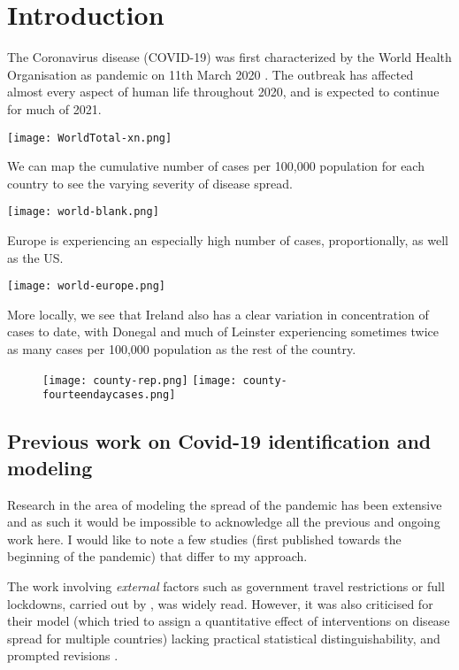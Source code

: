 \section{Introduction}
\label{ch:intro}

The Coronavirus disease (COVID-19) was first characterized by the World Health Organisation as pandemic on 11th March 2020 \cite{whodeclare20}. The outbreak has affected almost every aspect of human life throughout 2020, and is expected to continue for much of 2021. 

\texttt{[image: WorldTotal-xn.png]}

We can map the cumulative number of cases per 100,000 population for each country to see the varying severity of disease spread. 

\texttt{[image: world-blank.png]}

Europe is experiencing an especially high number of cases, proportionally, as well as the US.

\texttt{[image: world-europe.png]}

More locally, we see that Ireland also has a clear variation in concentration of cases to date, with Donegal and much of Leinster experiencing sometimes twice as many cases per 100,000 population as the rest of the country.

\begin{figure}[H]
\texttt{[image: county-rep.png]}
\endminipage\hfill
{}
\texttt{[image: county-fourteendaycases.png]}
\endminipage
\end{figure}

\subsection{Previous work on Covid-19 identification and modeling}
Research in the area of modeling the spread of the pandemic has been extensive and as such it would be impossible to acknowledge all the previous and ongoing work here. I would like to note a few studies (first published towards the beginning of the pandemic) that differ to my approach.

The work involving \textit{external} factors such as government travel restrictions or full lockdowns, carried out by \cite{flaxman20}, was widely read. However, it was also criticised for their model (which tried to assign a quantitative effect of interventions on disease spread for multiple countries) lacking practical statistical distinguishability, and prompted revisions \cite{flaxman20reply}.

